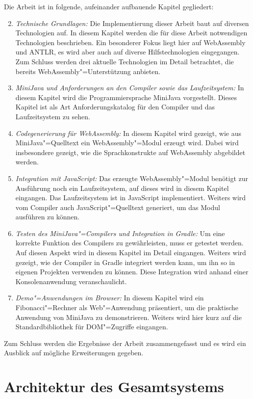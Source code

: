 Die Arbeit ist in folgende, aufeinander aufbauende Kapitel gegliedert:
\begin{enumerate}
    \setcounter{enumi}{1}
    \item \emph{Technische Grundlagen:} Die Implementierung dieser Arbeit baut auf diversen Technologien auf. In diesem Kapitel werden die für diese Arbeit notwendigen Technologien beschrieben. Ein besonderer Fokus liegt hier auf WebAssembly und ANTLR, es wird aber auch auf diverse Hilfstechnologien eingegangen. Zum Schluss werden drei aktuelle Technologien im Detail betrachtet, die bereits WebAssembly"=Unterstützung anbieten.
    \item \emph{MiniJava und Anforderungen an den Compiler sowie das Laufzeitsystem:} In diesem Kapitel wird die Programmiersprache MiniJava vorgestellt. Dieses Kapitel ist als Art Anforderungskatalog für den Compiler und das Laufzeitsystem zu sehen.
    \item \emph{Codegenerierung für WebAssembly:} In diesem Kapitel wird gezeigt, wie aus MiniJava"=Quelltext ein WebAssembly"=Modul erzeugt wird. Dabei wird insbesondere gezeigt, wie die Sprachkonstrukte auf WebAssembly abgebildet werden. 
    \item \emph{Integration mit JavaScript:} Das erzeugte WebAssembly"=Modul benötigt zur Ausführung noch ein Laufzeitsystem, auf dieses wird in diesem Kapitel eingangen. Das Laufzeitsystem ist in JavaScript implementiert. Weiters wird vom Compiler auch JavaScript"=Quelltext generiert, um das Modul ausführen zu können.
    \item \emph{Testen des MiniJava"=Compilers und Integration in Gradle:} Um eine korrekte Funktion des Compilers zu gewährleisten, muss er getestet werden. Auf diesen Aspekt wird in diesem Kapitel im Detail eingangen. Weiters wird gezeigt, wie der Compiler in Gradle integriert werden kann, um ihn so in eigenen Projekten verwenden zu können. Diese Integration wird anhand einer Konsolenanwendung veranschaulicht.
    \item \emph{Demo"=Anwendungen im Browser:} In diesem Kapitel wird ein Fibonacci"=Rechner als Web"=Anwendung präsentiert, um die praktische Anwendung von MiniJava zu demonstrieren. Weiters wird hier kurz auf die Standardbibliothek für DOM"=Zugriffe eingangen.
\end{enumerate}

Zum Schluss werden die Ergebnisse der Arbeit zusammengefasst und es wird ein Ausblick auf mögliche Erweiterungen gegeben.

\pagebreak
\section{Architektur des Gesamtsystems}


